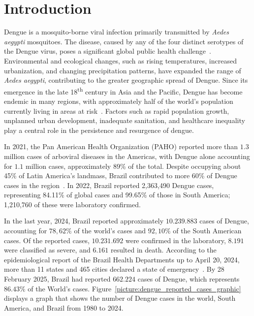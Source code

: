 \chapter{Introduction}\label{chp:introduction}

Dengue is a mosquito-borne viral infection primarily transmitted by \textit{Aedes aegypti} mosquitoes. The disease, caused by any of the four distinct serotypes of the Dengue virus, poses a significant global public health challenge~\citep{shepard:2016}. Environmental and ecological changes, such as rising temperatures, increased urbanization, and changing precipitation patterns, have expanded the range of \textit{Aedes aegypti}, contributing to the greater geographic spread of Dengue. Since its emergence in the late 18\textsuperscript{th} century in Asia and the Pacific, Dengue has become endemic in many regions, with approximately half of the world's population currently living in areas at risk~\citep{fares:2015,negreiros-2020}. Factors such as rapid population growth, unplanned urban development, inadequate sanitation, and healthcare inequality play a central role in the persistence and resurgence of dengue.

In 2021, the Pan American Health Organization (PAHO) reported more than $1.3$ million cases of arboviral diseases in the Americas, with Dengue alone accounting for $1.1$ million cases, approximately 89\% of the total. Despite occupying about 45\% of Latin America's landmass, Brazil contributed to more 60\% of Dengue cases in the region~\citep{BardachEtal2019}. In 2022, Brazil reported 2,363,490 Dengue cases, representing 84.11\% of global cases and 99.65\% of those in South America; 1,210,760 of these were laboratory confirmed. 

In the last year, 2024, Brazil reported approximately $10.239.883$ cases of Dengue, accounting for $78,62\%$ of the world's cases and $92,10\%$ of the South American cases. Of the reported cases, $10.231.692$ were confirmed in the laboratory, $8.191$ were classified as severe, and $6.161$ resulted in death. According to the epidemiological report of the Brazil Health Departments up to April 20, 2024, more than 11 states and 465 cities declared a state of emergency~\citep{health-dp-1}. By 28 February 2025, Brazil had reported $662.224$ cases of Dengue, which represents $86.43\%$ of the World's cases. Figure~\ref{picture:dengue_reported_cases_graphic}
displays a graph that shows the number of Dengue cases in the world, South America, and Brazil from 1980 to 2024.

